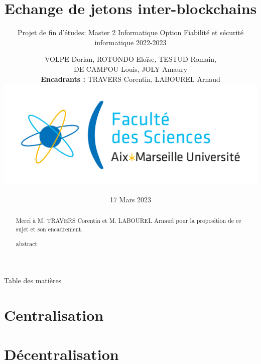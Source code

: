 \documentclass{beamer}
\title[Swap Cross-Blockchain]{Echange de jetons inter-blockchains}
\subtitle{Projet de fin d'études: Master 2 Informatique Option Fiabilité et sécurité informatique 2022-2023}
\author[M2 FSI]{VOLPE Dorian, ROTONDO Eloïse, TESTUD Romain,\\DE CAMPOU Louis, JOLY Amaury  \\ \textbf{Encadrants :} TRAVERS Corentin, LABOUREL Arnaud \\[2ex] \includegraphics[scale=0.1]{./img/amu.png}}
\institute[Aix-Marseille Université]{M2 Fiabilité et sécurité informatique}
\date{17 Mars 2023}
\newenvironment*{remerciements}{%
  \renewcommand*{\abstractname}{Remerciements}
  \begin{abstract}
}{
  \end{abstract}
}
\begin{document}
\maketitle

\begin{frame}
  \begin{remerciements}
    Merci à M. TRAVERS Corentin et M. LABOUREL Arnaud pour la proposition de ce sujet et son encadrement.
  \end{remerciements}
  \begin{abstract}
    abstract
  \end{abstract}
\end{frame}

\begin{frame}{Table des matières}
  \tableofcontents
\end{frame}

\section{Centralisation}

\section{Décentralisation}

\end{document}
